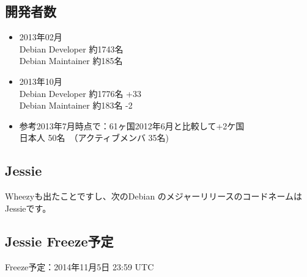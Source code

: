 \documentclass[mingoth,a4paper]{jsarticle}
\begin{document}

\subsection{開発者数}
\begin{itemize}
\item 2013年02月\\
Debian Developer 約1743名 \\
Debian Maintainer 約185名
\item 2013年10月\\
Debian Developer 約1776名 {\color{red}+33}\\
Debian Maintainer 約183名 {\color{blue}-2}\\

\item 参考2013年7月時点で：61ヶ国{2012年6月と比較して\color{red}+2ケ国}\\
日本人  50名　（アクティブメンバ 35名)

\end{itemize}

\subsection{Jessie}
 Wheezyも出たことですし、次のDebian のメジャーリリースのコードネームはJessieです。

\subsection{Jessie Freeze予定}
 Freeze予定：2014年11月5日 23:59 UTC
\end{document}
